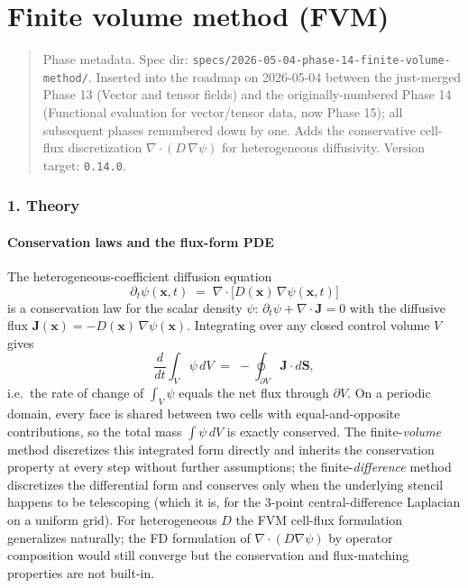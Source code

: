 \chapter{Finite volume method (FVM)}
\label{chap:dev:finite-volume-method}

\begin{quote}
Phase metadata. Spec dir:
\passthrough{\lstinline!specs/2026-05-04-phase-14-finite-volume-method/!}.
Inserted into the roadmap on 2026-05-04 between the just-merged
Phase 13 (Vector and tensor fields) and the originally-numbered
Phase 14 (Functional evaluation for vector/tensor data, now Phase 15);
all subsequent phases renumbered down by one.
Adds the conservative cell-flux discretization
\(\nabla\cdot(D\,\nabla\psi)\) for heterogeneous diffusivity. Version
target: \passthrough{\lstinline!0.14.0!}.
\end{quote}

\subsection{1. Theory}\label{phase14-theory}

\subsubsection{Conservation laws and the flux-form
PDE}\label{phase14-conservation}

The heterogeneous-coefficient diffusion equation
\[
\partial_t \psi(\mathbf x, t) \;=\; \nabla\cdot\!\big[D(\mathbf x)\,\nabla\psi(\mathbf x, t)\big]
\]
is a conservation law for the scalar density \(\psi\):
\(\partial_t \psi + \nabla\cdot\mathbf J = 0\) with the diffusive flux
\(\mathbf J(\mathbf x) = -D(\mathbf x)\,\nabla\psi(\mathbf x)\). Integrating over
any closed control volume \(V\) gives
\[
\frac{d}{dt}\int_V \psi\,dV \;=\; -\oint_{\partial V} \mathbf J \cdot d\mathbf S,
\]
i.e.\ the rate of change of \(\int_V \psi\) equals the net flux
through \(\partial V\). On a periodic domain, every face is shared
between two cells with equal-and-opposite contributions, so the
total mass \(\int \psi\,dV\) is exactly conserved. The
finite-\emph{volume} method discretizes this integrated form
directly and inherits the conservation property at every step
without further assumptions; the finite-\emph{difference} method
discretizes the differential form and conserves only when the
underlying stencil happens to be telescoping (which it is, for the
3-point central-difference Laplacian on a uniform grid). For
heterogeneous \(D\) the FVM cell-flux formulation generalizes
naturally; the FD formulation of \(\nabla\cdot(D\nabla\psi)\) by
operator composition would still converge but the conservation and
flux-matching properties are not built-in.

